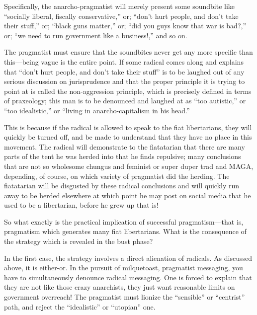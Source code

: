 \documentclass[11pt]{article}
\begin{document}
Specifically, the anarcho-pragmatist will merely present some soundbite like ``socially liberal, fiscally conservative,'' or; ``don't hurt people, and don't take their stuff,'' or; ``black guns matter,'' or; ``did you guys know that war is bad?,'' or; ``we need to run government like a business!,'' and so on.

The pragmatist must ensure that the soundbites never get any more specific than this---being vague is the entire point. If some radical comes along and explains that ``don't hurt people, and don't take their stuff'' is to be laughed out of any serious discussion on jurisprudence and that the proper principle it is trying to point at is called the non-aggression principle, which is precisely defined in terms of praxeology; this man is to be denounced and laughed at as ``too autistic,'' or ``too idealistic,'' or ``living in anarcho-capitalism in his head.''

This is because if the radical is allowed to speak to the fiat libertarians, they will quickly be turned off, and be made to understand that they have no place in this movement. The radical will demonstrate to the fiatatarian that there are many parts of the tent he was herded into that he finds repulsive; many conclusions that are not so wholesome chungus and feminist or super duper trad and MAGA, depending, of course, on which variety of pragmatist did the herding. The fiatatarian will be disgusted by these radical conclusions and will quickly run away to be herded elsewhere at which point he may post on social media that he used to be a libertarian, before he grew up that is!

So what exactly is the practical implication of successful pragmatism---that is, pragmatism which generates many fiat libertarians. What is the consequence of the strategy which is revealed in the bust phase?

In the first case, the strategy involves a direct alienation of radicals. As discussed above, it is either-or. In the pursuit of milquetoast, pragmatist messaging, you have to simultaneously denounce radical messaging. One is forced to explain that they are not like those crazy anarchists, they just want reasonable limits on government overreach! The pragmatist must lionize the ``sensible'' or ``centrist'' path, and reject the ``idealistic'' or ``utopian'' one.
\end{document}
